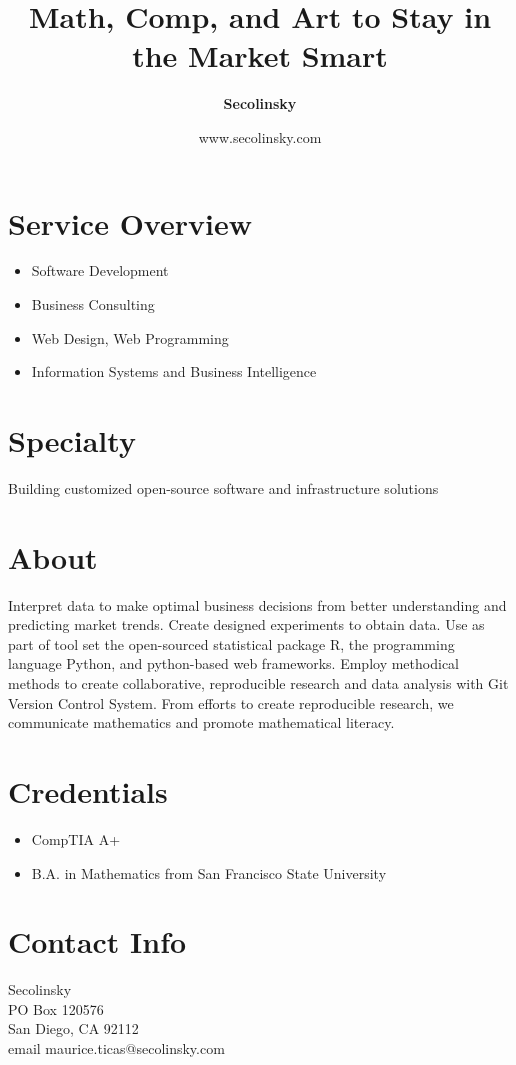 \documentclass[10pt,foldmark,notumble]{leaflet}
\title{\bf Math, Comp, and Art to Stay in the Market Smart}
\author{
\Large \bf Secolinsky
}
\date{www.secolinsky.com}
\begin{document}
\maketitle
\section{Service Overview} 
\begin{itemize}
\item Software Development
\item Business Consulting
\item Web Design, Web Programming
\item Information Systems and Business Intelligence
\end{itemize}


\section{Specialty}
Building customized open-source software and infrastructure solutions

\section{About}
Interpret data to make optimal business decisions from better
understanding and predicting market trends.  Create designed
experiments to obtain data.  Use as part of tool set the open-sourced
statistical package R, the programming language Python, and python-based 
web frameworks.  Employ methodical methods to create collaborative,
reproducible research and data analysis with Git Version Control System.
From efforts to create reproducible research, we communicate mathematics and promote mathematical literacy.
\newpage

\section{Credentials}
\begin{itemize}
\item CompTIA A+
\item B.A. in Mathematics from San Francisco State University
\end{itemize}


\section{Contact Info}
Secolinsky \\
PO Box 120576 \\
San Diego, CA 92112 \\
email maurice.ticas@secolinsky.com \\
\end{document}
